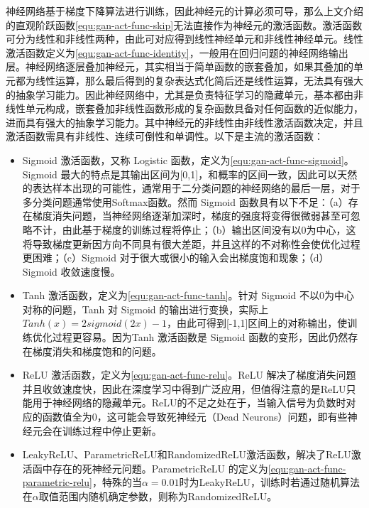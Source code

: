 神经网络基于梯度下降算法进行训练，因此神经元的计算必须可导，那么上文介绍的直观阶跃函数\ref{equ:gan-act-func-skip}无法直接作为神经元的激活函数。激活函数可分为线性和非线性两种，由此可对应得到线性神经单元和非线性神经单元。线性激活函数定义为\ref{equ:gan-act-func-identity}，一般用在回归问题的神经网络输出层。神经网络逐层叠加神经元，其实相当于简单函数的嵌套叠加，如果其叠加的单元都为线性运算，那么最后得到的复杂表达式化简后还是线性运算，无法具有强大的抽象学习能力。因此神经网络中，尤其是负责特征学习的隐藏单元，基本都由非线性单元构成，嵌套叠加非线性函数形成的复杂函数具备对任何函数的近似能力，进而具有强大的抽象学习能力。其中神经元的非线性由非线性激活函数决定，并且激活函数需具有非线性、连续可倒性和单调性。以下是主流的激活函数：
\begin{itemize}
  \item Sigmoid 激活函数，又称 Logistic 函数，定义为\ref{equ:gan-act-func-sigmoid}。Sigmoid 最大的特点是其输出区间为[0,1]，和概率的区间一致，因此可以天然的表达样本出现的可能性，通常用于二分类问题的神经网络的最后一层，对于多分类问题通常使用Softmax函数。然而 Sigmoid 函数具有以下不足：（a）存在梯度消失问题，当神经网络逐渐加深时，梯度的强度将变得很微弱甚至可忽略不计，由此基于梯度的训练过程将停止；（b）输出区间没有以0为中心，这将导致梯度更新因方向不同具有很大差距，并且这样的不对称性会使优化过程更困难；（c）Sigmoid 对于很大或很小的输入会出梯度饱和现象；（d）Sigmoid 收敛速度慢。
  \item Tanh 激活函数，定义为\ref{equ:gan-act-func-tanh}。针对 Sigmoid 不以0为中心对称的问题，Tanh 对 Sigmoid 的输出进行变换，实际上$Tanh(x) = 2sigmoid(2x)-1$，由此可得到[-1,1]区间上的对称输出，使训练优化过程更容易。因为Tanh 激活函数是 Sigmoid 函数的变形，因此仍然存在梯度消失和梯度饱和的问题。
  \item ReLU 激活函数，定义为\ref{equ:gan-act-func-relu}。ReLU 解决了梯度消失问题并且收敛速度快，因此在深度学习中得到广泛应用，但值得注意的是ReLU只能用于神经网络的隐藏单元。ReLU的不足之处在于，当输入信号为负数时对应的函数值全为0，这可能会导致死神经元（Dead Neurons）问题，即有些神经元会在训练过程中停止更新。
  \item LeakyReLU、ParametricReLU和RandomizedReLU激活函数，解决了ReLU激活函中存在的死神经元问题。ParametricReLU 的定义为\ref{equ:gan-act-func-parametric-relu}，特殊的当$\alpha = 0.01$时为LeakyReLU，训练时若通过随机算法在$\alpha$取值范围内随机确定参数，则称为RandomizedReLU。
\end{itemize}

